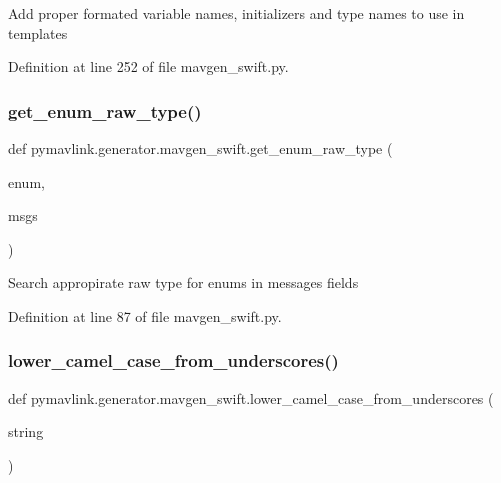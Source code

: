 \begin{DoxyVerb}Add proper formated variable names, initializers and type names to use in templates\end{DoxyVerb}
 

Definition at line 252 of file mavgen\+\_\+swift.\+py.

\mbox{\label{namespacepymavlink_1_1generator_1_1mavgen__swift_afb9a96a35873d4a61daddaeac5c6a853}} 
\subsubsection{\texorpdfstring{get\_enum\_raw\_type()}{get\_enum\_raw\_type()}}
{\footnotesize\ttfamily def pymavlink.\+generator.\+mavgen\+\_\+swift.\+get\+\_\+enum\+\_\+raw\+\_\+type (\begin{DoxyParamCaption}\item[{}]{enum,  }\item[{}]{msgs }\end{DoxyParamCaption})}

\begin{DoxyVerb}Search appropirate raw type for enums in messages fields\end{DoxyVerb}
 

Definition at line 87 of file mavgen\+\_\+swift.\+py.

\mbox{\label{namespacepymavlink_1_1generator_1_1mavgen__swift_a760d6a0be86d0a7a913f3294776c9032}} 
\subsubsection{\texorpdfstring{lower\_camel\_case\_from\_underscores()}{lower\_camel\_case\_from\_underscores()}}
{\footnotesize\ttfamily def pymavlink.\+generator.\+mavgen\+\_\+swift.\+lower\+\_\+camel\+\_\+case\+\_\+from\+\_\+underscores (\begin{DoxyParamCaption}\item[{}]{string }\end{DoxyParamCaption})}


